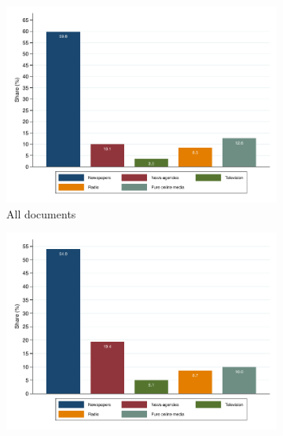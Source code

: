 

\clearpage
\pagebreak
\begin{figure}
\begin{center}
\begin{subfigure}{1\textwidth}
 	    \centering
 	    \includegraphics[scale=.6]{figures/share_documents_used_media_category_m}
 	    \caption{All documents}
 	    \label{fig:share_documents_used_media_category_m}
\end{subfigure}
\begin{subfigure}{1\textwidth}
 	    \centering
 	    \includegraphics[scale=.6]{figures/share_documents_used_media_category_m_C}

\end{subfigure}
\end{center}
\end{figure}
